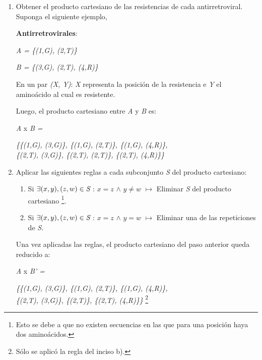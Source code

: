 \begin{enumerate}
  \item  Obtener el producto cartesiano de las resistencias de cada antirretroviral. Suponga el siguiente ejemplo,

    \textbf{Antirretrovirales}:
    \vspace{-.5cm}
    \begin{center}
      \emph {A = \{(1,G), (2,T)\}}
    
      \emph {B = \{(3,G), (2,T), (4,R)\}}
     \end{center}
      \scriptsize{En un par \emph{(X, Y)}: \emph{X} representa la posici\'on de la resistencia e \emph{Y} el amino\'acido al cual es resistente.}

      \normalsize{}Luego, el producto cartesiano entre \emph{A} y \emph{B} es:

  \emph{A} x \emph{B =} \vspace{-1cm}
                       \begin{center}
                          \emph{\{\{(1,G), (3,G)\}, \{(1,G), (2,T)\}, \{(1,G), (4,R)\}, \\
                          \{(2,T), (3,G)\}, \{(2,T), (2,T)\}, \{(2,T), (4,R)\}\}}
                       \end{center}
  \item  Aplicar las siguientes reglas a cada subconjunto \emph {S} del producto cartesiano:
      \begin{enumerate}
       \item Si $\exists(x,y),(z,w)\in\emph{S}$ : $x=z$  $\wedge$  $y\neq w$  $\mapsto$  Eliminar \emph{S} del producto cartesiano
         \footnote{Esto se debe a que no existen secuencias en las que para una posici\'on haya dos amino\'acidos.}.

       \item Si $\exists(x,y),(z,w)\in\emph{S}$ : $x=z$  $\wedge$  $y=w$  $\mapsto$  Eliminar una de las repeticiones de \emph{S}.
      \end{enumerate}
     	Una vez aplicadas las reglas, el producto cartesiano del paso anterior queda reducido a:
      
      \emph {A} x \emph{B' =} \vspace{-1cm}
      \begin{center}
         \emph{\{\{(1,G), (3,G)\}, \{(1,G), (2,T)\}, \{(1,G), (4,R)\}, \\
                \{(2,T), (3,G)\}, \{(2,T)\}, \{(2,T), (4,R)\}\}}
         \footnote{S\'olo se aplic\'o la regla del inciso b).}
      \end{center}


\end{enumerate}
